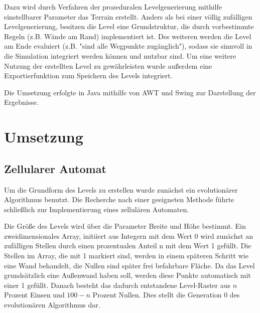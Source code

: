 \documentclass[10pt,a4paper]{article}
\begin{document}
Dazu wird durch Verfahren der prozeduralen Levelgenerierung mithilfe einstellbarer Parameter das Terrain erstellt. Anders als bei einer völlig zufälligen Levelgenerierung, besitzen die Level eine Grundstruktur, die durch vorbestimmte Regeln (z.B. Wände am Rand) implementiert ist. Des weiteren werden die Level am Ende evaluiert (z.B. "sind alle Wegpunkte zugänglich"), sodass sie sinnvoll in die Simulation integriert werden können und nutzbar sind. Um eine weitere Nutzung der erstellten Level zu gewährleisten wurde außerdem eine Exportierfunktion zum Speichern des Levels integriert.

Die Umsetzung erfolgte in Java mithilfe von AWT und Swing zur Darstellung der Ergebnisse.

\section{Umsetzung}
\subsection{Zellularer Automat}
Um die Grundform des Levels zu erstellen wurde zunächst ein evolutionärer Algorithmus benutzt. Die Recherche nach einer geeigneten Methode führte schließlich zur Implementierung eines zellulären Automaten. %

Die Größe des Levels wird über die Parameter Breite und Höhe bestimmt. Ein zweidimensionales Array, initiiert aus Integern mit dem Wert 0 wird zunächst an zufälligen Stellen durch einen prozentualen Anteil n mit dem Wert 1 gefüllt. Die Stellen im Array, die mit 1 markiert sind, werden in einem späteren Schritt wie eine Wand behandelt, die Nullen sind später frei befahrbare Fläche. Da das Level grundsätzlich eine Außenwand haben soll, werden diese Punkte automatisch mit einer 1 gefüllt. Danach besteht das dadurch entstandene Level-Raster aus $n$ Prozent Einsen und $100-n$ Prozent Nullen. %
Dies stellt die Generation 0 des evolutionären Algorithmus dar.
\end{document}
